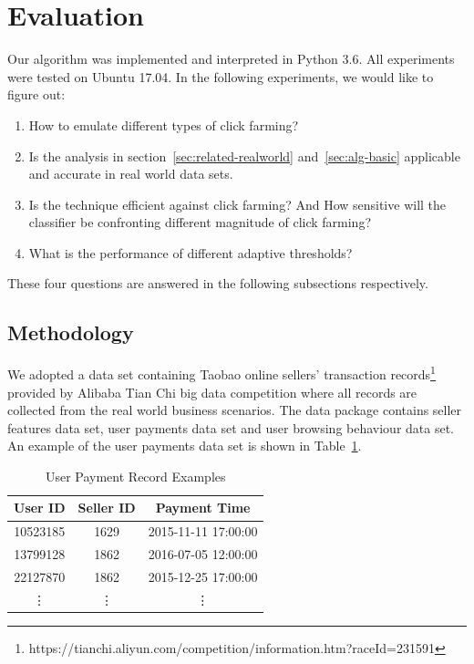 \documentclass[10pt,conference,letterpaper]{IEEEtran}
\begin{document}
	\section{Evaluation}\label{sec:evaluation}
		Our algorithm was implemented and interpreted in Python 3.6. All experiments were tested on Ubuntu 17.04. In the following experiments, we would like to figure out:
	
		\begin{enumerate}
			\item How to emulate different types of click farming?
			\item Is the analysis in section~\ref{sec:related-realworld} and~\ref{sec:alg-basic} applicable and accurate in real world data sets.
			\item Is the technique efficient against click farming? And How sensitive will the classifier be confronting different magnitude of click farming?
			\item What is the performance of different adaptive thresholds?
		\end{enumerate}
	
		These four questions are answered in the following subsections respectively.
	
		\subsection{Methodology}\label{sec:exp-methodology}
			We adopted a data set containing Taobao online sellers' transaction records\footnote{https://tianchi.aliyun.com/competition/information.htm?raceId=231591} provided by Alibaba Tian Chi big data competition where all records are collected from the real world business scenarios. The data package contains seller features data set, user payments data set and user browsing behaviour data set. An example of the user payments data set is shown in Table~\ref{tab:user-payment-sample}.
	
			\begin{table}[!ht]
				\centering
				\caption{User Payment Record Examples}
				\label{tab:user-payment-sample}
				\begin{tabular}{|c|c|c|}
					\hline
					User ID & Seller ID & Payment Time\\
					\hline
					10523185 & 1629 & 2015-11-11 17:00:00\\
					\hline
					13799128 & 1862 & 2016-07-05 12:00:00\\
					\hline
					22127870 & 1862 & 2015-12-25 17:00:00\\
					\hline
					\vdots & \vdots & \vdots\\
					\hline
				\end{tabular}
			\end{table}
	
\end{document}
